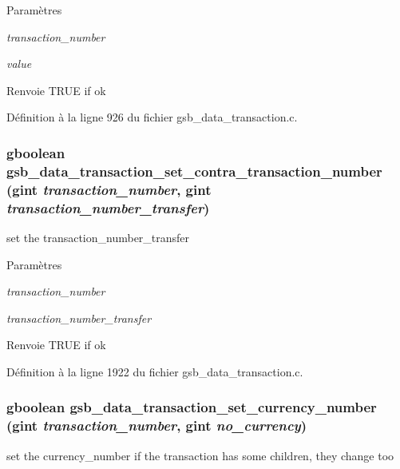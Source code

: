 \begin{DoxyParams}{Paramètres}
\item[{\em transaction\_\-number}]\item[{\em value}]\end{DoxyParams}
\begin{DoxyReturn}{Renvoie}
TRUE if ok 
\end{DoxyReturn}


Définition à la ligne 926 du fichier gsb\_\-data\_\-transaction.c.

\subsubsection[{gsb\_\-data\_\-transaction\_\-set\_\-contra\_\-transaction\_\-number}]{\setlength{\rightskip}{0pt plus 5cm}gboolean gsb\_\-data\_\-transaction\_\-set\_\-contra\_\-transaction\_\-number (gint {\em transaction\_\-number}, \/  gint {\em transaction\_\-number\_\-transfer})}\label{gsb__data__transaction_8c_a7b333676b59c4dae3c5e56a88b4981e3}
set the transaction\_\-number\_\-transfer


\begin{DoxyParams}{Paramètres}
\item[{\em transaction\_\-number}]\item[{\em transaction\_\-number\_\-transfer}]\end{DoxyParams}
\begin{DoxyReturn}{Renvoie}
TRUE if ok 
\end{DoxyReturn}


Définition à la ligne 1922 du fichier gsb\_\-data\_\-transaction.c.

\subsubsection[{gsb\_\-data\_\-transaction\_\-set\_\-currency\_\-number}]{\setlength{\rightskip}{0pt plus 5cm}gboolean gsb\_\-data\_\-transaction\_\-set\_\-currency\_\-number (gint {\em transaction\_\-number}, \/  gint {\em no\_\-currency})}\label{gsb__data__transaction_8c_ad36cc91a9e388b0d249e8d65c17debc0}
set the currency\_\-number if the transaction has some children, they change too


